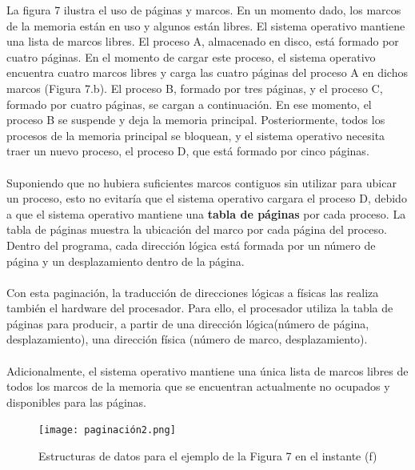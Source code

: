 \documentclass[12pt,a4paper]{article}
\begin{document}
La figura 7 ilustra el uso de páginas y marcos. En un momento dado, los marcos de la memoria están en uso y algunos están libres. El sistema operativo mantiene una lista de marcos libres. El proceso A, almacenado en disco, está formado por cuatro páginas. En el momento de cargar este proceso, el sistema operativo encuentra cuatro marcos libres y carga las cuatro páginas del proceso A en dichos marcos (Figura 7.b). El proceso B, formado por tres páginas, y el proceso C, formado por cuatro páginas, se cargan a continuación. En ese momento, el proceso B se suspende y deja la memoria principal. Posteriormente, todos los procesos de la memoria principal se bloquean, y el sistema operativo necesita traer un nuevo proceso, el proceso D, que está formado por cinco páginas. \\\\ 
Suponiendo que no hubiera suficientes marcos contiguos sin utilizar para ubicar un proceso, esto no evitaría que el sistema operativo cargara el proceso D, debido a que el sistema operativo mantiene una \textbf{tabla de páginas} por cada proceso. La tabla de páginas muestra la ubicación del marco por cada página del proceso. Dentro del programa, cada dirección lógica está formada por un número de página y un desplazamiento dentro de la página.\\\\
Con esta paginación, la traducción de direcciones lógicas a físicas las realiza también el hardware del procesador. Para ello, el procesador utiliza la tabla de páginas para producir, a partir de una dirección lógica(número de página, desplazamiento), una dirección física (número de marco, desplazamiento).\\\\ 
Adicionalmente, el sistema operativo mantiene una única lista de marcos libres de todos los marcos de la memoria que se encuentran actualmente no ocupados y disponibles para las páginas.
\begin{figure}[H]
    \centering
    \texttt{[image: paginación2.png]}
    \caption{Estructuras de datos para el ejemplo de la Figura 7 en el instante (f)}
\end{figure}
\end{document}
